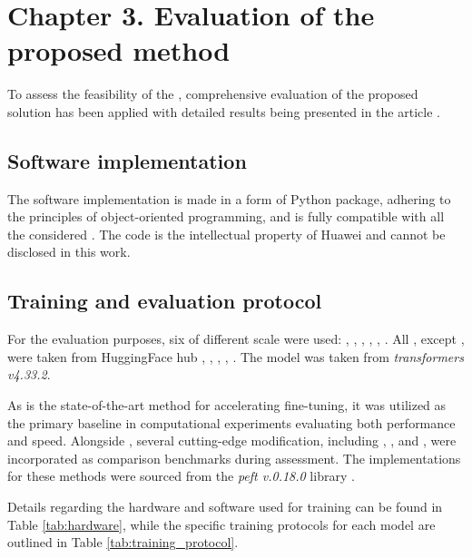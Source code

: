 \section*{Chapter 3. Evaluation of the proposed method}
\setcounter{section}{3}
\setcounter{subsection}{0}
To assess the feasibility of the \ourmethodshort{}, comprehensive evaluation of the proposed solution has been applied with detailed results being presented in the article \cite{Demidovskij2025}. 

\subsection{Software implementation}
    The software implementation is made in a form of Python package, adhering to the principles of object-oriented programming, and is fully compatible with all the considered \llms{}. The code is the intellectual property of Huawei and cannot be disclosed in this work.

\subsection{Training and evaluation protocol}\label{subsec:protocol}
For the evaluation purposes, six \llms{} of different scale were used: \gpt{}, \llamaTwoSmall{}, \llamaTwoBig{}, \qwenSmall{}, \qwenMedium{}, \qwenLarge{}. All \llms{}, except \gpt{}, were taken from HuggingFace hub \cite{huggingface:llama2-7b}, \cite{huggingface:llama2-13b}, \cite{huggingface:qwen-small}, \cite{huggingface:qwen-medium}, \cite{huggingface:qwen-large}.
The \gpt{} model was taken from \textit{transformers v4.33.2}.




As \lora{} is the state-of-the-art method for accelerating fine-tuning, it was utilized as the primary baseline in computational experiments evaluating both performance and speed. Alongside \lora{}, several cutting-edge modification, including \dora{} \cite{dora}, \pissa{} \cite{pissa}, and \adalora{} \cite{adalora}, were incorporated as comparison benchmarks during assessment. The implementations for these methods were sourced from the \textit{peft v.0.18.0} library \cite{peft}.

Details regarding the hardware and software used for training can be found in Table \ref{tab:hardware}, while the specific training protocols for each model are outlined in Table \ref{tab:training_protocol}.

